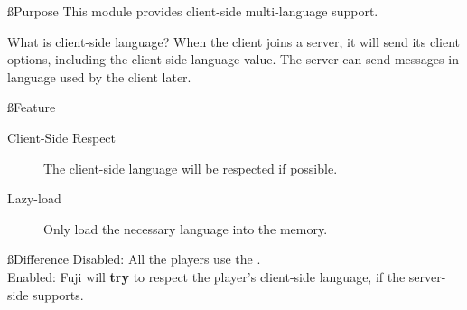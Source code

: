 \ss{Purpose}
This module provides client-side multi-language support.

\begin{note}{What is client-side language?}
    When the client joins a server, it will send its client options, including the client-side language value.
    The server can send messages in language used by the client later.
\end{note}


\ss{Feature}
\begin{description}
    \item[Client-Side Respect] The client-side language will be respected if possible.
    \item[Lazy-load] Only load the necessary language into the memory.
\end{description}


\ss{Difference}
Disabled: All the players use the .
\\
Enabled: Fuji will \textbf{try} to respect the player's client-side language, if the server-side supports.
